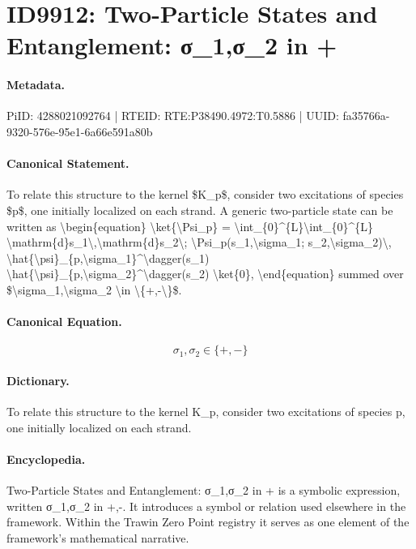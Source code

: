 \section*{ID9912: Two-Particle States and Entanglement: σ\_1,σ\_2 in +}
\paragraph{Metadata.}
PiID: 4288021092764 | RTEID: RTE:P38490.4972:T0.5886 | UUID: fa35766a-9320-576e-95e1-6a66e591a80b

\paragraph{Canonical Statement.}
To relate this structure to the kernel \$K\_p\$, consider two excitations of species \$p\$, one initially localized on each strand. A generic two-particle state can be written as \textbackslash{}begin\{equation\} \textbackslash{}ket\{\textbackslash{}Psi\_p\} = \textbackslash{}int\_\{0\}\textasciicircum{}\{L\}\textbackslash{}int\_\{0\}\textasciicircum{}\{L\} \textbackslash{}mathrm\{d\}s\_1\textbackslash{},\textbackslash{}mathrm\{d\}s\_2\textbackslash{}; \textbackslash{}Psi\_p(s\_1,\textbackslash{}sigma\_1; s\_2,\textbackslash{}sigma\_2)\textbackslash{}, \textbackslash{}hat\{\textbackslash{}psi\}\_\{p,\textbackslash{}sigma\_1\}\textasciicircum{}\textbackslash{}dagger(s\_1) \textbackslash{}hat\{\textbackslash{}psi\}\_\{p,\textbackslash{}sigma\_2\}\textasciicircum{}\textbackslash{}dagger(s\_2) \textbackslash{}ket\{0\}, \textbackslash{}end\{equation\} summed over \$\textbackslash{}sigma\_1,\textbackslash{}sigma\_2 \textbackslash{}in \textbackslash{}\{+,-\textbackslash{}\}\$.

\paragraph{Canonical Equation.}
\[
\sigma_1,\sigma_2 \in \{+,-\}
\]

\paragraph{Dictionary.}
To relate this structure to the kernel K\_p, consider two excitations of species p, one initially localized on each strand.

\paragraph{Encyclopedia.}
Two-Particle States and Entanglement: σ\_1,σ\_2 in + is a symbolic expression, written σ\_1,σ\_2 in +,-. It introduces a symbol or relation used elsewhere in the framework. Within the Trawin Zero Point registry it serves as one element of the framework's mathematical narrative.
